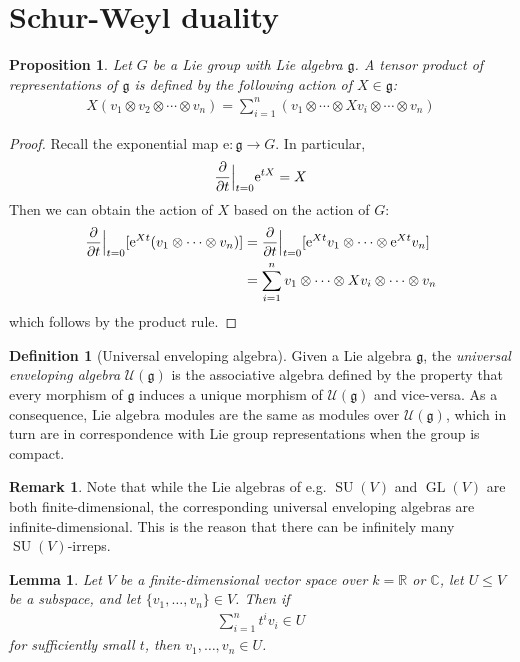 \documentclass[11pt]{article}
\newtheorem{prop}{Proposition}
\newtheorem{lem}{Lemma}
\theoremstyle{definition}
\newtheorem{defn}{Definition}
\newtheorem{rmk}{Remark}
\newcommand{\GL}{\operatorname{GL}}
\newcommand{\SU}{\operatorname{SU}}
\newcommand{\e}{\mathrm{e}}
\begin{document}
\section{Schur-Weyl duality}
\begin{prop}
  Let $G$ be a Lie group with Lie algebra $\mathfrak g$. A tensor product of
  representations of $\mathfrak g$ is defined by the following action of $X \in
  \mathfrak g$:
  \begin{align}
    X(v_1 \otimes v_2 \otimes \cdots \otimes v_n) = \sum_{i=1}^n (v_1 \otimes \cdots \otimes Xv_i \otimes \cdots \otimes v_n)
  \end{align}
\end{prop}

\begin{proof}
Recall the exponential map $\e : \mathfrak g \to G$. In particular, 
\begin{align}
  \pdv{t}\Big|_{t=0} \e^{tX} = X
\end{align}
Then we can obtain the action of $X$ based on the action of $G$:
\begin{align}
\pdv{t}\Big|_{t=0}[\e^{Xt}(v_1 \otimes \cdots \otimes v_n)] &= 
  \pdv{t}\Big|_{t=0}[\e^{Xt}v_1 \otimes \cdots \otimes \e^{Xt} v_n] \\
  &= \sum_{i = 1}^n v_1 \otimes \cdots \otimes Xv_i \otimes \cdots \otimes v_n
\end{align}
which follows by the product rule.
\end{proof}

\begin{defn}[Universal enveloping algebra]
Given a Lie algebra $\mathfrak g$, the \textit{universal enveloping algebra}
$\mathcal U(\mathfrak g)$ is the associative algebra defined by the property
that every morphism of $\mathfrak g$ induces a unique morphism of $\mathcal
U(\mathfrak g)$ and vice-versa. As a consequence, Lie algebra modules are the same as modules
over $\mathcal U(\mathfrak g)$, which in turn are in correspondence with Lie
group representations when the group is compact.
\end{defn}

\begin{rmk}
  Note that while the Lie algebras of e.g. $\SU(V)$ and $\GL(V)$ are both
  finite-dimensional, the corresponding universal enveloping algebras are
  infinite-dimensional. This is the reason that there can be infinitely many $\SU(V)$-irreps.
\end{rmk}

\begin{lem}
Let $V$ be a finite-dimensional vector space over $k = \mathbb R$ or $\mathbb C$, let $U \leq V$ be a subspace, and
let $\{v_1, \dots, v_n\} \in V$.  Then if
\begin{align}
  \sum_{i = 1}^n t^iv_i \in U
\end{align}
for sufficiently small $t$, then $v_1, \dots, v_n \in U$.
\end{lem}
\end{document}
